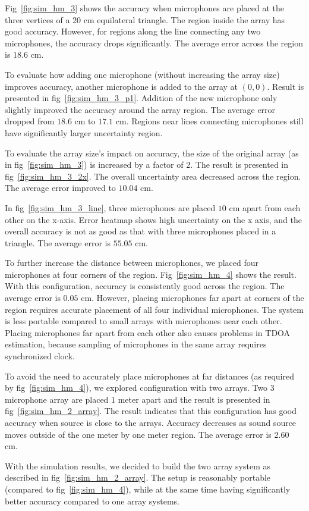 Fig~\ref{fig:sim_hm_3} shows the accuracy when microphones are placed at the three vertices of a $20$ cm equilateral triangle. The region inside the array has good accuracy. However, for regions along the line connecting any two microphones, the accuracy drops significantly. The average error across the region is $18.6$ cm.

To evaluate how adding one microphone (without increasing the array size) improves accuracy, another microphone is added to the array at $(0,0)$. Result is presented in fig~\ref{fig:sim_hm_3_p1}. Addition of the new microphone only slightly improved the accuracy around the array region. The average error dropped from $18.6$ cm to $17.1$ cm. Regions near lines connecting microphones still have significantly larger uncertainty region.

To evaluate the array size's impact on accuracy, the size of the original array (as in fig~\ref{fig:sim_hm_3}) is increased by a factor of $2$. The result is presented in fig~\ref{fig:sim_hm_3_2x}. The overall uncertainty area decreased across the region. The average error improved to $10.04$ cm. 

In fig~\ref{fig:sim_hm_3_line}, three microphones are placed $10$ cm apart from each other on the x-axis. Error heatmap shows high uncertainty on the x axis, and the overall accuracy is not as good as that with three microphones placed in a triangle. The average error is $55.05$ cm. 

To further increase the distance between microphones, we placed four microphones at four corners of the region. Fig~\ref{fig:sim_hm_4} shows the result. With this configuration, accuracy is consistently good across the region. The average error is $0.05$ cm.  However, placing microphones far apart at corners of the region requires accurate placement of all four individual microphones. The system is less portable compared to small arrays with microphones near each other. Placing microphones far apart from each other also causes problems in TDOA estimation, because sampling of microphones in the same array requires synchronized clock.

To avoid the need to accurately place microphones at far distances (as required by fig~\ref{fig:sim_hm_4}), we explored configuration with two arrays. Two $3$ microphone array are placed $1$ meter apart and the result is presented in fig~\ref{fig:sim_hm_2_array}.  The result indicates that this configuration has good accuracy when source is close to the arrays. Accuracy decreases as sound source moves outside of the one meter by one meter region. The average error is $2.60$ cm. 

With the simulation results, we decided to build the two array system as described in fig~\ref{fig:sim_hm_2_array}. The setup is reasonably portable (compared to fig~\ref{fig:sim_hm_4}), while at the same time having significantly better accuracy compared to one array systems.
